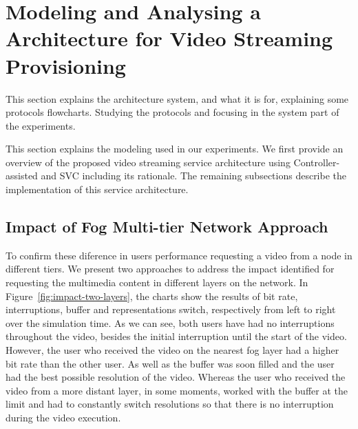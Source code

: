 \section{Modeling and Analysing a Architecture for Video Streaming Provisioning}
\label{sec:system-archi}

{\color{blue} This section explains the architecture system, and what it is  for, explaining some protocols flowcharts. Studying the protocols and focusing in the system part of the experiments.}

This section explains the modeling used in our experiments. We first provide an overview of the proposed video streaming service architecture using Controller-assisted and SVC including its rationale. The remaining subsections describe the implementation of this service architecture.

\subsection{Impact of Fog Multi-tier Network Approach}

To confirm these diference in users performance requesting a video from a node in different tiers. We present two approaches to address the impact identified for requesting the multimedia content in different layers on the network. In Figure~\ref{fig:impact-two-layers}, the charts show the results of bit rate, interruptions, buffer and representations switch, respectively from left to right over the simulation time. As we can see, both users have had no interruptions throughout the video, besides the initial interruption until the start of the video. However, the user who received the video on the nearest fog layer had a higher bit rate than the other user. As well as the buffer was soon filled and the user had the best possible resolution of the video. Whereas the user who received the video from a more distant layer, in some moments, worked with the buffer at the limit and had to constantly switch resolutions so that there is no interruption during the video execution.


